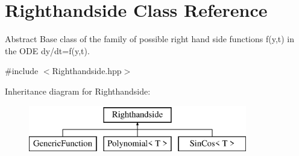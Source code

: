 \hypertarget{class_righthandside}{}\section{Righthandside Class Reference}
\label{class_righthandside}


Abstract Base class of the family of possible right hand side functions f(y,t) in the O\+D\+E dy/dt=f(y,t).  




{\ttfamily \#include $<$Righthandside.\+hpp$>$}

Inheritance diagram for Righthandside\+:\begin{figure}[H]
\begin{center}
\leavevmode
\includegraphics[height=2.000000cm]{class_righthandside}
\end{center}
\end{figure}
